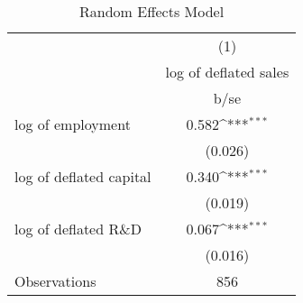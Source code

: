 \begin{table}[htbp]\centering
\def\sym#1{\ifmmode^{#1}\else\(^{#1}\)\fi}
\caption{Random Effects Model}
\begin{tabular}{l*{1}{c}}
\toprule
                    &\multicolumn{1}{c}{(1)}\\
                    &\multicolumn{1}{c}{log of deflated sales}\\
                    &        b/se         \\
\midrule
log of employment   &       0.582\sym{***}\\
                    &     (0.026)         \\
log of deflated capital&       0.340\sym{***}\\
                    &     (0.019)         \\
log of deflated R\&D &       0.067\sym{***}\\
                    &     (0.016)         \\
\midrule
Observations        &         856         \\
\bottomrule
\end{tabular}
\end{table}
